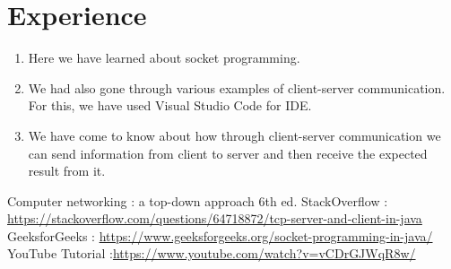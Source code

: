 \documentclass[11pt]{article}
\begin{document}
\section{Experience}
\begin{enumerate}
   \item Here we have learned about socket programming.
    \item We had also gone through various examples of client-server communication. For this, we have used Visual Studio Code for IDE.
    \item We have come to know about how through client-server communication we can send information from client to server and then receive the expected result from it.
\end{enumerate}
\begin{thebibliography}{1}
  Computer networking : a top-down approach 6th ed.
 StackOverflow : \url{https://stackoverflow.com/questions/64718872/tcp-server-and-client-in-java}
 GeeksforGeeks : \url{https://www.geeksforgeeks.org/socket-programming-in-java/}
 YouTube Tutorial :\url{https://www.youtube.com/watch?v=vCDrGJWqR8w/}
\end{thebibliography}
\end{document}
